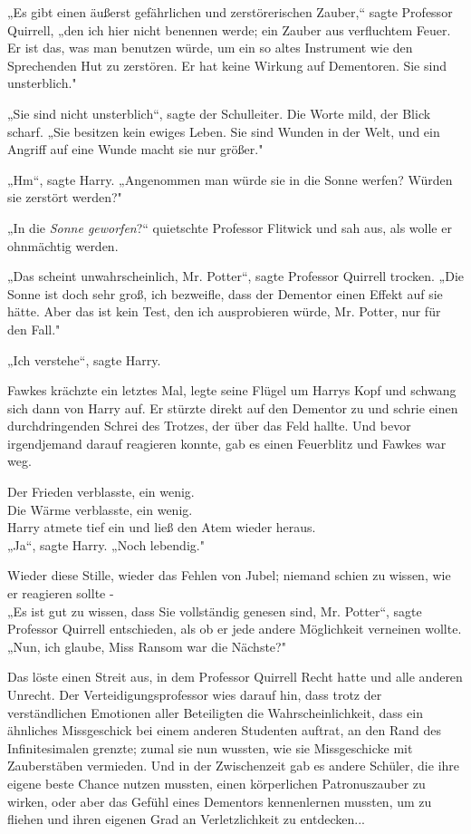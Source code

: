 {„Es gibt einen äußerst gefährlichen und zerstörerischen Zauber,“ sagte Professor Quirrell, „den ich hier nicht benennen werde; ein Zauber aus verfluchtem Feuer. Er ist das, was man benutzen würde, um ein so altes Instrument wie den Sprechenden Hut zu zerstören. Er hat keine Wirkung auf Dementoren. Sie sind unsterblich."

„Sie sind nicht unsterblich“, sagte der Schulleiter. Die Worte mild, der Blick scharf. „Sie besitzen kein ewiges Leben. Sie sind Wunden in der Welt, und ein Angriff auf eine Wunde macht sie nur größer."

„Hm“, sagte Harry. „Angenommen man würde sie in die Sonne werfen? Würden sie zerstört werden?"

„In die \emph{Sonne geworfen}?“ quietschte Professor Flitwick und sah aus, als wolle er ohnmächtig werden.

„Das scheint unwahrscheinlich, Mr. Potter“, sagte Professor Quirrell trocken. „Die Sonne ist doch sehr groß, ich bezweifle, dass der Dementor einen Effekt auf sie hätte. Aber das ist kein Test, den ich ausprobieren würde, Mr. Potter, nur für den Fall."

„Ich verstehe“, sagte Harry.

Fawkes krächzte ein letztes Mal, legte seine Flügel um Harrys Kopf und schwang sich dann von Harry auf. Er stürzte direkt auf den Dementor zu und schrie einen durchdringenden Schrei des Trotzes, der über das Feld hallte. Und bevor irgendjemand darauf reagieren konnte, gab es einen Feuerblitz und Fawkes war weg.

Der Frieden verblasste, ein wenig.\\ Die Wärme verblasste, ein wenig.\\ Harry atmete tief ein und ließ den Atem wieder heraus.\\ „Ja“, sagte Harry. „Noch lebendig."

Wieder diese Stille, wieder das Fehlen von Jubel; niemand schien zu wissen, wie er reagieren sollte -\\ „Es ist gut zu wissen, dass Sie vollständig genesen sind, Mr. Potter“, sagte Professor Quirrell entschieden, als ob er jede andere Möglichkeit verneinen wollte. „Nun, ich glaube, Miss Ransom war die Nächste?"

Das löste einen Streit aus, in dem Professor Quirrell Recht hatte und alle anderen Unrecht. Der Verteidigungsprofessor wies darauf hin, dass trotz der verständlichen Emotionen aller Beteiligten die Wahrscheinlichkeit, dass ein ähnliches Missgeschick bei einem anderen Studenten auftrat, an den Rand des Infinitesimalen grenzte; zumal sie nun wussten, wie sie Missgeschicke mit Zauberstäben vermieden. Und in der Zwischenzeit gab es andere Schüler, die ihre eigene beste Chance nutzen mussten, einen körperlichen Patronuszauber zu wirken, oder aber das Gefühl eines Dementors kennenlernen mussten, um zu fliehen und ihren eigenen Grad an Verletzlichkeit zu entdecken...

}
